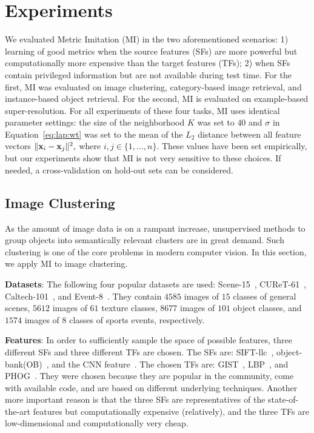 
\section{Experiments} 
\label{mi:sec:exp}

We evaluated Metric Imitation (MI) in the two aforementioned
scenarios: 1) learning of good metrics when the source
features (SFs) are more powerful but computationally more expensive
than the target features (TFs); 2) when SFs contain privileged
information but are not available during test time. For the first, MI
was evaluated on image clustering, category-based image retrieval, and
instance-based object retrieval. For the second, MI is evaluated on
example-based super-resolution. For all experiments of these four
tasks, MI uses identical parameter settings: the size of the
neighborhood $K$ was set to $40$ and $\sigma$ in Equation~\ref{eq:lap:wt}
was set to the mean of the $L_2$ distance between all feature vectors $\|
{\mathbf x}_i - {\mathbf x}_j \|^2, $ where $i, j \in \{1, ..., n \}$. These
values have been set empirically, but our experiments show that MI is
not very sensitive to these choices. If needed, a cross-validation on
hold-out sets can be considered.



\subsection{Image Clustering}
\label{mi:sec:img:clustering}
As the amount of image data is on a rampant increase, unsupervised 
methods to group objects into semantically relevant clusters are in 
great demand. Such clustering is one of the core problems in modern
computer vision. In this section, we apply MI to image clustering.

\textbf{Datasets}: The following four popular datasets are used:
Scene-15~\citep{lazebnik:cvpr06}, CUReT-61~\citep{CUReT-61},
Caltech-101~\citep{FeiFei2004}, and Event-8~\citep{event8}. They contain
$4585$ images of $15$ classes of general scenes, $5612$ images of $61$
texture classes, $8677$ images of $101$ object classes, and $1574$
images of $8$ classes of sports events, respectively.

\textbf{Features}: In order to sufficiently sample the space of
possible features, three different SFs and three different TFs are
chosen. The SFs are: SIFT-llc~\citep{siftllc:cvpr10},
object-bank(OB)~\citep{objectbank:nips10}, and the CNN
feature~\citep{deep:bmvc14}. The chosen TFs are: GIST~\citep{gist},
LBP~\citep{lbp}, and PHOG~\citep{phog}. They were chosen because they
are popular in the community, come with available code, and are based
on different underlying techniques. Another more important reason is
that the three SFs are representatives of the state-of-the-art
features but computationally expensive (relatively), and the three TFs
are low-dimensional and computationally very cheap.

